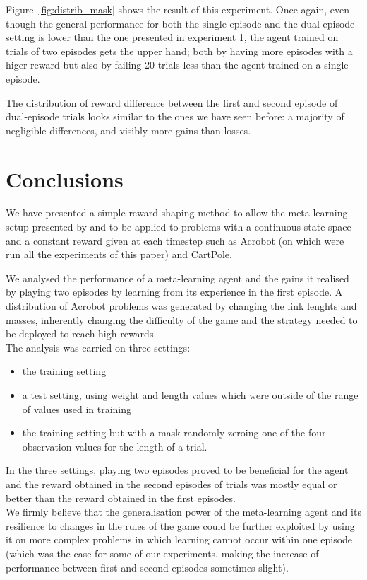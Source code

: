 \documentclass[letterpaper]{article}
\begin{document}
Figure~\ref{fig:distrib_mask} shows the result of this experiment. Once again,
even though the general performance for both the single-episode and the
dual-episode setting is lower than the one presented in experiment 1, the
agent trained on trials of two episodes gets the upper hand; both by
having more episodes with a higer reward but also by failing 20 trials less
than the agent trained on a single episode.

The distribution of reward difference between the first and second episode
of dual-episode trials looks similar to the ones we have seen before: a
majority of negligible differences, and visibly more gains than losses.

\section{Conclusions}
We have presented a simple reward shaping method to allow the meta-learning
setup presented by \cite{learningtorl} and \cite{fastrlviaslowrl} to be applied
to problems with a continuous state space and a constant reward given at
each timestep such as Acrobot (on which were run all the experiments of this
paper) and CartPole.

We analysed the performance of a meta-learning agent and the gains it realised
by playing two episodes by learning from its experience in the first episode.
A distribution of Acrobot problems was generated by changing the link lenghts
and masses, inherently changing the difficulty of the game and the strategy
needed to be deployed to reach high rewards.\\

The analysis was carried on three settings:
\begin{itemize}
	\item the training setting
	\item a test setting, using weight and length values which were
		outside of the range of values used in training
	\item the training setting but with a mask randomly zeroing one of the
		four observation values for the length of a trial.
\end{itemize}
In the three settings, playing two episodes proved to be beneficial for the 
agent and the reward obtained in the second episodes of trials was mostly
equal or better than the reward obtained in the first episodes.\\

We firmly believe that the generalisation power of the meta-learning agent
and its resilience to changes in the rules of the game could be further
exploited by using it on more complex problems in which learning cannot occur
within one episode (which was the case for some of our experiments, making
the increase of performance between first and second episodes sometimes slight).
\end{document}

